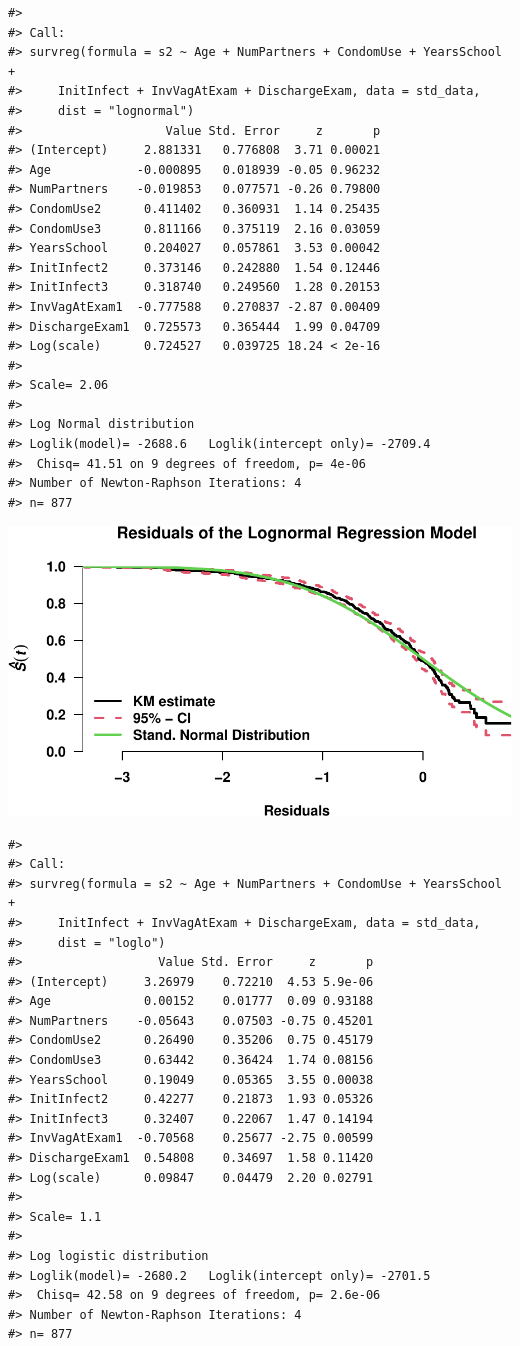 \documentclass[
]{article}
\begin{document}
\begin{verbatim}
#> 
#> Call:
#> survreg(formula = s2 ~ Age + NumPartners + CondomUse + YearsSchool + 
#>     InitInfect + InvVagAtExam + DischargeExam, data = std_data, 
#>     dist = "lognormal")
#>                    Value Std. Error     z       p
#> (Intercept)     2.881331   0.776808  3.71 0.00021
#> Age            -0.000895   0.018939 -0.05 0.96232
#> NumPartners    -0.019853   0.077571 -0.26 0.79800
#> CondomUse2      0.411402   0.360931  1.14 0.25435
#> CondomUse3      0.811166   0.375119  2.16 0.03059
#> YearsSchool     0.204027   0.057861  3.53 0.00042
#> InitInfect2     0.373146   0.242880  1.54 0.12446
#> InitInfect3     0.318740   0.249560  1.28 0.20153
#> InvVagAtExam1  -0.777588   0.270837 -2.87 0.00409
#> DischargeExam1  0.725573   0.365444  1.99 0.04709
#> Log(scale)      0.724527   0.039725 18.24 < 2e-16
#> 
#> Scale= 2.06 
#> 
#> Log Normal distribution
#> Loglik(model)= -2688.6   Loglik(intercept only)= -2709.4
#>  Chisq= 41.51 on 9 degrees of freedom, p= 4e-06 
#> Number of Newton-Raphson Iterations: 4 
#> n= 877
\end{verbatim}

\includegraphics{practical_files/figure-latex/fit-lognormal-1.pdf}

\begin{verbatim}
#> 
#> Call:
#> survreg(formula = s2 ~ Age + NumPartners + CondomUse + YearsSchool + 
#>     InitInfect + InvVagAtExam + DischargeExam, data = std_data, 
#>     dist = "loglo")
#>                   Value Std. Error     z       p
#> (Intercept)     3.26979    0.72210  4.53 5.9e-06
#> Age             0.00152    0.01777  0.09 0.93188
#> NumPartners    -0.05643    0.07503 -0.75 0.45201
#> CondomUse2      0.26490    0.35206  0.75 0.45179
#> CondomUse3      0.63442    0.36424  1.74 0.08156
#> YearsSchool     0.19049    0.05365  3.55 0.00038
#> InitInfect2     0.42277    0.21873  1.93 0.05326
#> InitInfect3     0.32407    0.22067  1.47 0.14194
#> InvVagAtExam1  -0.70568    0.25677 -2.75 0.00599
#> DischargeExam1  0.54808    0.34697  1.58 0.11420
#> Log(scale)      0.09847    0.04479  2.20 0.02791
#> 
#> Scale= 1.1 
#> 
#> Log logistic distribution
#> Loglik(model)= -2680.2   Loglik(intercept only)= -2701.5
#>  Chisq= 42.58 on 9 degrees of freedom, p= 2.6e-06 
#> Number of Newton-Raphson Iterations: 4 
#> n= 877
\end{verbatim}
\end{document}
